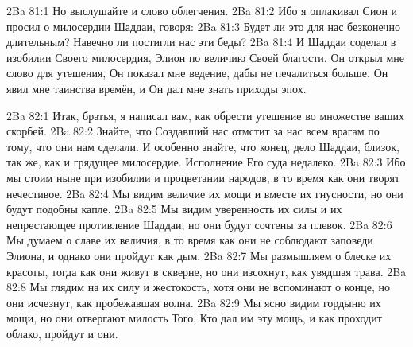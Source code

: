 \vs 2Ba 81:1
Но выслушайте и слово облегчения.
\vs 2Ba 81:2
Ибо я оплакивал Сион и просил о милосердии Шаддаи, говоря:
\vs 2Ba 81:3
Будет ли это для нас безконечно длительным? Навечно ли постигли нас эти беды?
\vs 2Ba 81:4
И Шаддаи соделал в изобилии Своего милосердия, Элион по величию Своей благости. Он открыл мне слово для утешения, Он показал мне ведение, дабы не печалиться больше. Он явил мне таинства времён, и Он дал мне знать приходы эпох.

\vs 2Ba 82:1
Итак, братья, я написал вам, как обрести утешение во множестве ваших скорбей.
\vs 2Ba 82:2
Знайте, что Создавший нас отмстит за нас всем врагам по тому, что они нам сделали. И особенно знайте, что конец, дело Шаддаи, близок, так же, как и грядущее милосердие. Исполнение Его суда недалеко.
\vs 2Ba 82:3
Ибо мы стоим ныне при изобилии и процветании народов, в то время как они творят нечестивое.
\vs 2Ba 82:4
Мы видим величие их мощи и вместе их гнусности, но они будут подобны капле.
\vs 2Ba 82:5
Мы видим уверенность их силы и их непрестающее противление Шаддаи, но они будут сочтены за плевок.
\vs 2Ba 82:6
Мы думаем о славе их величия, в то время как они не соблюдают заповеди Элиона, и однако они пройдут как дым.
\vs 2Ba 82:7
Мы размышляем о блеске их красоты, тогда как они живут в скверне, но они изсохнут, как увядшая трава.
\vs 2Ba 82:8
Мы глядим на их силу и жестокость, хотя они не вспоминают о конце, но они исчезнут, как пробежавшая волна.
\vs 2Ba 82:9
Мы ясно видим гордыню их мощи, но они отвергают милость Того, Кто дал им эту мощь, и как проходит облако, пройдут и они.

